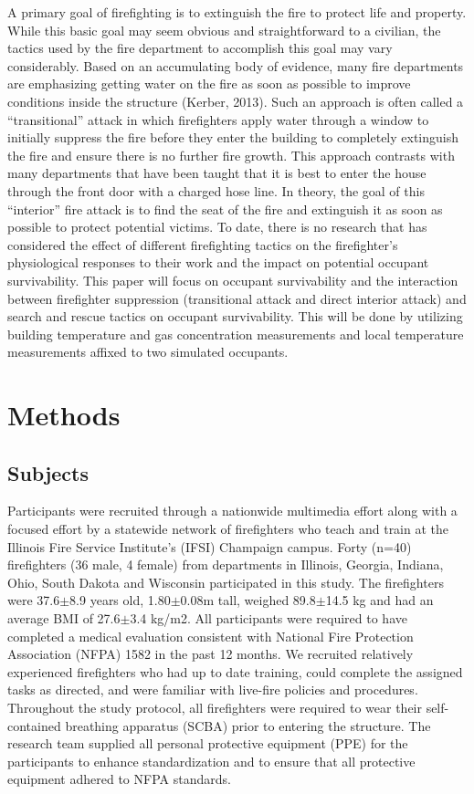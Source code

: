\documentclass[12pt,oneside]{book}
\begin{document}
A primary goal of firefighting is to extinguish the fire to protect life and property. While this basic goal may seem obvious and straightforward to a civilian, the tactics used by the fire department to accomplish this goal may vary considerably. Based on an accumulating body of evidence, many fire departments are emphasizing getting water on the fire as soon as possible to improve conditions inside the structure (Kerber, 2013). Such an approach is often called a ``transitional'' attack in which firefighters apply water through a window to initially suppress the fire before they enter the building to completely extinguish the fire and ensure there is no further fire growth.  This approach contrasts with many departments that have been taught that it is best to enter the house through the front door with a charged hose line. In theory, the goal of this ``interior'' fire attack is to find the seat of the fire and extinguish it as soon as possible to protect potential victims. To date, there is no research that has considered the effect of different firefighting tactics on the firefighter's physiological responses to their work and the impact on potential occupant survivability.
This paper will focus on occupant survivability and the interaction between firefighter suppression (transitional attack and direct interior attack) and search and rescue tactics on occupant survivability.  This will be done by utilizing building temperature and gas concentration measurements and local temperature measurements affixed to two simulated occupants.  

\section{Methods}
\label{sec:methods}

\subsection{Subjects}
Participants were recruited through a nationwide multimedia effort along with a focused effort by a statewide network of firefighters who teach and train at the Illinois Fire Service Institute's (IFSI) Champaign campus. Forty (n=40) firefighters (36 male, 4 female) from departments in Illinois, Georgia, Indiana, Ohio, South Dakota and Wisconsin participated in this study. The firefighters were 37.6$\pm$8.9 years old, 1.80$\pm$0.08m tall, weighed 89.8$\pm$14.5 kg and had an average BMI of 27.6$\pm$3.4 kg/m2.
All participants were required to have completed a medical evaluation consistent with National Fire Protection Association (NFPA) 1582 in the past 12 months. We recruited relatively experienced firefighters who had up to date training, could complete the assigned tasks as directed, and were familiar with live-fire policies and procedures. Throughout the study protocol, all firefighters were required to wear their self-contained breathing apparatus (SCBA) prior to entering the structure. The research team supplied all personal protective equipment (PPE) for the participants to enhance standardization and to ensure that all protective equipment adhered to NFPA standards.
\end{document}
